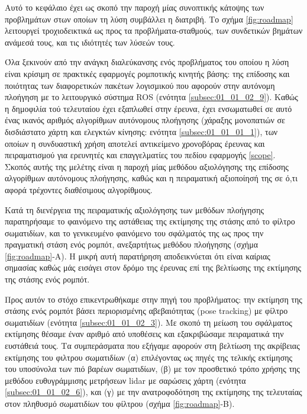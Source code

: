 Αυτό το κεφάλαιο έχει ως σκοπό την παροχή μίας συνοπτικής κάτοψης των
προβλημάτων στων οποίων τη λύση συμβάλλει η διατριβή. Το σχήμα
\ref{fig:roadmap} λειτουργεί τροχιοδεικτικά ως προς τα προβλήματα-σταθμούς,
των συνδετικών βημάτων ανάμεσά τους, και τις ιδιότητές των λύσεών τους.


Όλα ξεκινούν από την ανάγκη διαλεύκανσης ενός προβλήματος του οποίου η λύση
είναι κρίσιμη σε πρακτικές εφαρμογές ρομποτικής κινητής βάσης: της επίδοσης και
ποιότητας των διαφορετικών πακέτων λογισμικού που αφορούν στην αυτόνομη
πλοήγηση με το λειτουργικό σύστημα ROS (ενότητα \ref{subsec:01_01_02_9}).
Καθώς η δημοφιλία τού τελευταίου έχει εξαπλωθεί στην έρευνα, έχει ενσωματωθεί
σε αυτό ένας ικανός αριθμός αλγορίθμων αυτόνομους πλοήγησης (χάραξης μονοπατιών
σε δισδιάστατο χάρτη και ελεγκτών κίνησης: ενότητα \ref{subsec:01_01_01_1}),
των οποίων η συνδυαστική χρήση αποτελεί αντικείμενο χρονοβόρας έρευνας και
πειραματισμού για ερευνητές και επαγγελματίες του πεδίου εφαρμογής \ref{scope}.
Σκοπός αυτής της μελέτης είναι η παροχή μίας μεθόδου αξιολόγησης της επίδοσης
αλγορίθμων αυτόνομους πλοήγησης, καθώς και η πειραματική αξιοποίησή της σε ό,τι
αφορά τρέχοντες διαθέσιμους αλγορίθμους.

Κατά τη διενέργεια της πειραματικής αξιολόγησης των μεθόδων πλοήγησης
παρατηρήσαμε το φαινόμενο της αστάθειας της εκτίμησης της στάσης από το φίλτρο
σωματιδίων, και το γενικευμένο φαινόμενο του σφάλματός της ως προς την
πραγματική στάση ενός ρομπότ, ανεξαρτήτως μεθόδου πλοήγησης (σχήμα
\ref{fig:roadmap}-Α). Η μικρή αυτή παρατήρηση αποδεικνύεται ότι είναι καίριας
σημασίας καθώς μάς εισάγει στον δρόμο της έρευνας επί της βελτίωσης της
εκτίμησης της στάσης ενός ρομπότ.


Προς αυτόν το στόχο επικεντρωθήκαμε στην πηγή του προβλήματος: την εκτίμηση της
στάσης ενός ρομπότ βάσει περιορισμένης αβεβαιότητας (pose tracking) με φίλτρο
σωματιδίων (ενότητα \ref{subsec:01_01_02_3}). Με σκοπό τη μείωση του
σφάλματος εκτίμησης θέσαμε έναν αριθμό από υποθέσεις και εξακριβώσαμε
πειραματικά την ευστάθειά τους. Τα συμπεράσματα που εξήγαμε αφορούν στη
βελτίωση της ακρίβειας εκτίμησης του φιλτρου σωματιδίων (α) επιλέγοντας ως
πηγές της τελικής εκτίμησης του υποσύνολα των πιό βαρέων σωματιδίων, (β) με τον
προσθετικό τρόπο χρήσης της μεθόδου ευθυγράμμισης μετρήσεων lidar με σαρώσεις
χάρτη (ενότητα \ref{subsec:01_01_02_6}), και (γ) με την ανατροφοδότηση της
εκτίμησης της τελευταίας στον πληθυσμό σωματιδίων του φίλτρου (σχήμα
\ref{fig:roadmap}-Β).

